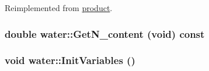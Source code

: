 Reimplemented from \hyperlink{classproduct_a18a1df87f3400774db21d1e8c573f04a}{product}.\hypertarget{classwater_af7e3ec493176d6dc5eb75d688ba2b1fc}{
\subsubsection[{GetN\_\-content}]{\setlength{\rightskip}{0pt plus 5cm}double water::GetN\_\-content (void) const}}
\label{classwater_af7e3ec493176d6dc5eb75d688ba2b1fc}
\hypertarget{classwater_a43ecfbe5d9e5a62ff43a4273985ae766}{
\subsubsection[{InitVariables}]{\setlength{\rightskip}{0pt plus 5cm}void water::InitVariables ()}}
\label{classwater_a43ecfbe5d9e5a62ff43a4273985ae766}


